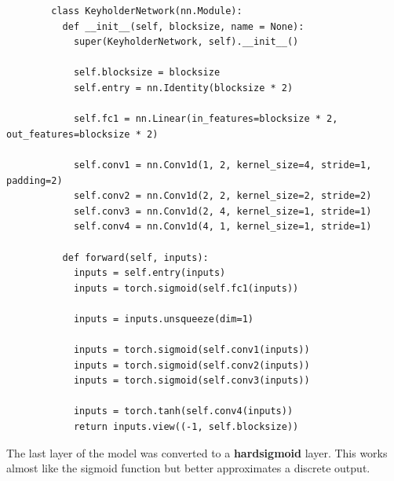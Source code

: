 \documentclass[a4paper]{article}
\begin{document}
      \begin{lstlisting}
        class KeyholderNetwork(nn.Module):
          def __init__(self, blocksize, name = None):
            super(KeyholderNetwork, self).__init__()
            
            self.blocksize = blocksize
            self.entry = nn.Identity(blocksize * 2)
        
            self.fc1 = nn.Linear(in_features=blocksize * 2, out_features=blocksize * 2)
            
            self.conv1 = nn.Conv1d(1, 2, kernel_size=4, stride=1, padding=2)
            self.conv2 = nn.Conv1d(2, 2, kernel_size=2, stride=2)
            self.conv3 = nn.Conv1d(2, 4, kernel_size=1, stride=1)
            self.conv4 = nn.Conv1d(4, 1, kernel_size=1, stride=1)
        
          def forward(self, inputs):    
            inputs = self.entry(inputs)
            inputs = torch.sigmoid(self.fc1(inputs))

            inputs = inputs.unsqueeze(dim=1)

            inputs = torch.sigmoid(self.conv1(inputs))
            inputs = torch.sigmoid(self.conv2(inputs))
            inputs = torch.sigmoid(self.conv3(inputs))

            inputs = torch.tanh(self.conv4(inputs))
            return inputs.view((-1, self.blocksize))
      \end{lstlisting}

      The last layer of the model was converted to a {\bfseries hardsigmoid} layer. This works
      almost like the sigmoid function but better approximates a discrete output.
      
\end{document}
